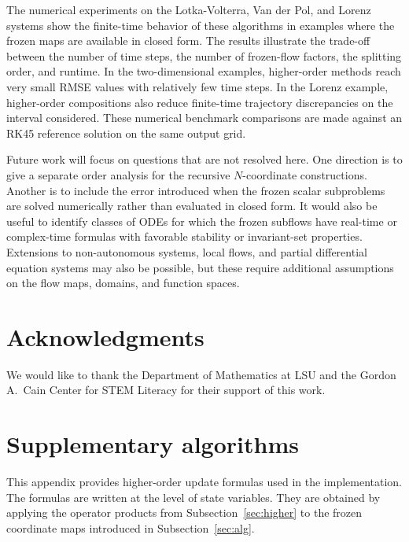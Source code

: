 \documentclass[preprint,1p,times,nopreprintline]{elsarticle}
\begin{document}
The numerical experiments on the Lotka-Volterra, Van der Pol, and Lorenz systems show the finite-time behavior of these algorithms in examples where the frozen maps are available in closed form. The results illustrate the trade-off between the number of time steps, the number of frozen-flow factors, the splitting order, and runtime. In the two-dimensional examples, higher-order methods reach very small RMSE values with relatively few time steps. In the Lorenz example, higher-order compositions also reduce finite-time trajectory discrepancies on the interval considered. These numerical benchmark comparisons are made against an RK45 reference solution on the same output grid.

Future work will focus on questions that are not resolved here. One direction is to give a separate order analysis for the recursive $N$-coordinate constructions. Another is to include the error introduced when the frozen scalar subproblems are solved numerically rather than evaluated in closed form. It would also be useful to identify classes of ODEs for which the frozen subflows have real-time or complex-time formulas with favorable stability or invariant-set properties. Extensions to non-autonomous systems, local flows, and partial differential equation systems may also be possible, but these require additional assumptions on the flow maps, domains, and function spaces.


\section*{Acknowledgments}

We would like to thank the Department of Mathematics at LSU and the Gordon A.~Cain Center for STEM Literacy for their support of this work.

\appendix

\section{Supplementary algorithms}
\label{supp:supplementary_algo}

This appendix provides higher-order update formulas used in the implementation. The formulas are written at the level of state variables. They are obtained by applying the operator products from Subsection~\ref{sec:higher} to the frozen coordinate maps introduced in Subsection~\ref{sec:alg}.
\end{document}
